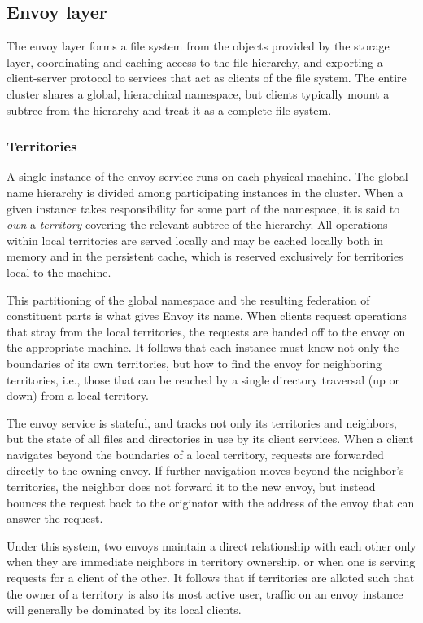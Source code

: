 \subsection{Envoy layer}

The envoy layer forms a file system from the objects provided by the storage layer, coordinating and caching access to the file hierarchy, and exporting a client-server protocol to services that act as clients of the file system. The entire cluster shares a global, hierarchical namespace, but clients typically mount a subtree from the hierarchy and treat it as a complete file system.

\subsubsection{Territories}

A single instance of the envoy service runs on each physical machine. The global name hierarchy is divided among participating instances in the cluster. When a given instance takes responsibility for some part of the namespace, it is said to \emph{own} a \emph{territory} covering the relevant subtree of the hierarchy. All operations within local territories are served locally and may be cached locally both in memory and in the persistent cache, which is reserved exclusively for territories local to the machine.

This partitioning of the global namespace and the resulting federation of constituent parts is what gives Envoy its name. When clients request operations that stray from the local territories, the requests are handed off to the envoy on the appropriate machine. It follows that each instance must know not only the boundaries of its own territories, but how to find the envoy for neighboring territories, i.e., those that can be reached by a single directory traversal (up or down) from a local territory.

The envoy service is stateful, and tracks not only its territories and neighbors, but the state of all files and directories in use by its client services. When a client navigates beyond the boundaries of a local territory, requests are forwarded directly to the owning envoy. If further navigation moves beyond the neighbor's territories, the neighbor does not forward it to the new envoy, but instead bounces the request back to the originator with the address of the envoy that can answer the request.

Under this system, two envoys maintain a direct relationship with each other only when they are immediate neighbors in territory ownership, or when one is serving requests for a client of the other. It follows that if territories are alloted such that the owner of a territory is also its most active user, traffic on an envoy instance will generally be dominated by its local clients.


